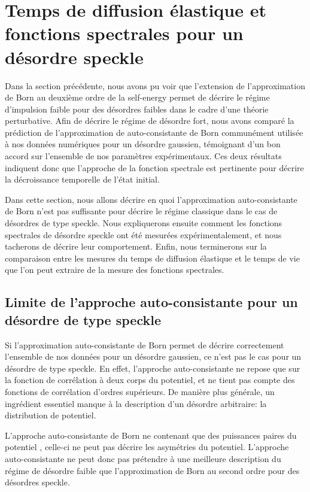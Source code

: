 \section{Temps de diffusion élastique et fonctions spectrales pour un désordre speckle}

Dans la section précédente, nous avons pu voir que l'extension de l'approximation de Born au deuxième ordre de la self-energy permet de décrire le régime d'impulsion faible pour des désordres faibles dans le cadre d'une théorie perturbative. Afin de décrire le régime de désordre fort, nous avons comparé la prédiction de l'approximation de auto-consistante de Born communément utilisée à nos données numériques pour un désordre gaussien, témoignant d'un bon accord sur l'ensemble de nos paramètres expérimentaux. Ces deux résultats indiquent donc que l'approche de la fonction spectrale est pertinente pour décrire la décroissance temporelle de l'état initial.

Dans cette section, nous allons décrire en quoi l'approximation auto-consistante de Born n'est pas suffisante pour décrire le régime classique dans le cas de désordres de type speckle. Nous expliquerons ensuite comment les fonctions spectrales de désordre speckle ont été mesurées expérimentalement, et nous tacherons de décrire leur comportement. Enfin, nous terminerons sur la comparaison entre les mesures du temps de diffusion élastique et le temps de vie que l'on peut extraire de la mesure des fonctions spectrales.


\subsection{Limite de l'approche auto-consistante pour un désordre de type speckle}
Si l'approximation auto-consistante de Born permet de décrire correctement l'ensemble de nos données pour un désordre gaussien, ce n'est pas le cas pour un désordre de type speckle. En effet, l'approche auto-consistante ne repose que sur la fonction de corrélation à deux corps du potentiel, et ne tient pas compte des fonctions de corrélation d'ordres supérieurs. De manière plus générale, un ingrédient essentiel manque à la description d'un désordre arbitraire: la distribution de potentiel. 

L'approche auto-consistante de Born ne contenant que des puissances paires du potentiel \citep{trappe2015semiclassical}, celle-ci ne peut pas décrire les asymétries du potentiel. L'approche auto-consistante ne peut donc pas prétendre à une meilleure description du régime de désordre faible que l'approximation de Born au second ordre pour des désordres speckle. 

